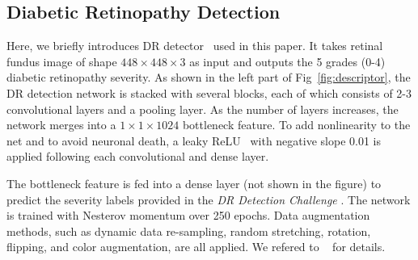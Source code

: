 \documentclass[letterpaper]{article} %
\begin{document}
	\subsection{Diabetic Retinopathy Detection}
  Here, we  briefly introduces  DR detector~\cite{oO2016detector} used in this paper. It takes retinal fundus image of shape $448 \times 448 \times 3$ as input  and outputs the 5 grades (0-4) diabetic retinopathy severity.
   As shown in the left part of Fig~\ref{fig:descriptor}, the DR detection network is stacked with several blocks, each of which consists of 2-3 convolutional layers and a pooling layer. As the number of layers increases, the network merges into a  $ 1\times 1 \times 1024$ bottleneck feature. To add nonlinearity to the net and to avoid neuronal death, a leaky ReLU~\cite{maas2013rectifier} with negative slope 0.01 is applied following each convolutional and dense layer.

   The bottleneck feature is fed into a dense layer (not shown in the figure) to predict the severity labels provided in the \textit{DR Detection Challenge} \cite{kaggle2016diabetic}. The network is trained with Nesterov momentum over 250 epochs. Data augmentation methods, such as dynamic data re-sampling, random stretching, rotation, flipping, and color augmentation, are all applied. We refered to ~\cite{oO2016detector} for details.












\end{document}
